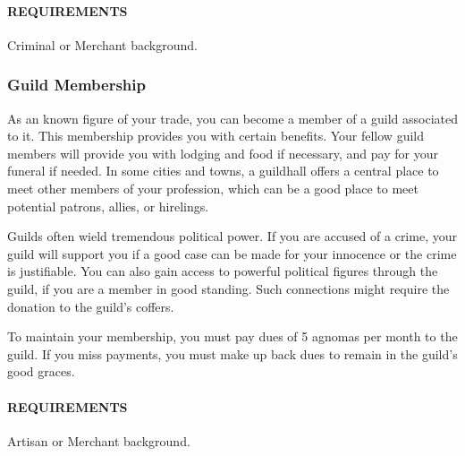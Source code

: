         \paragraph{REQUIREMENTS} Criminal or Merchant background.

    \subsubsection{Guild Membership} \label{feat::guildmembership}
        As an known figure of your trade, you can become a member of a guild associated to it.
        This membership provides you with certain benefits.
        Your fellow guild members will provide you with lodging and food if necessary, and pay for your funeral if needed.
        In some cities and towns, a guildhall offers a central place to meet other members of your profession, which can be a good place to meet potential patrons, allies, or hirelings.

        Guilds often wield tremendous political power.
        If you are accused of a crime, your guild will support you if a good case can be made for your innocence or the crime is justifiable.
        You can also gain access to powerful political figures through the guild, if you are a member in good standing.
        Such connections might require the donation to the guild's coffers.

        To maintain your membership, you must pay dues of 5 agnomas per month to the guild.
        If you miss payments, you must make up back dues to remain in the guild's good graces.
        \paragraph{REQUIREMENTS} Artisan or Merchant background.

